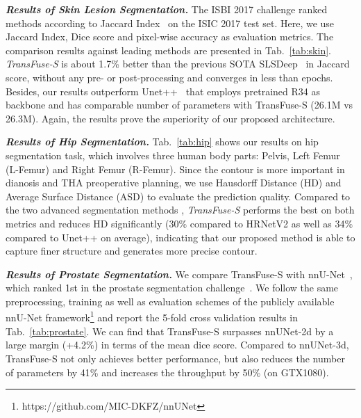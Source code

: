 \documentclass[runningheads]{llncs}
\begin{document}
\textit{\textbf{Results of Skin Lesion Segmentation.}}
The ISBI 2017 challenge ranked methods according to Jaccard Index~\cite{codella2018skin} on the ISIC 2017 test set. Here, we use Jaccard Index, Dice score and pixel-wise accuracy as evaluation metrics. The comparison results against leading methods are presented in Tab.~\ref{tab:skin}. \textit{TransFuse-S} is about 1.7\% better than the previous SOTA SLSDeep~\cite{sarker2018slsdeep} in Jaccard score, without any pre- or post-processing and converges in less than  epochs. Besides, our results outperform Unet++~\cite{zhou2018unet++} that employs pretrained R34 as backbone and has comparable number of parameters with TransFuse-S (26.1M vs 26.3M). Again, the results prove the superiority of our proposed architecture.  


\textit{\textbf{Results of Hip Segmentation.}}
Tab.~\ref{tab:hip} shows our results on hip segmentation task, which involves three human body parts: Pelvis, Left Femur (L-Femur) and Right Femur (R-Femur). Since the contour is more important in dianosis and THA preoperative planning, we use Hausdorff Distance (HD) and Average Surface Distance (ASD) to evaluate the prediction quality. Compared to the two advanced segmentation methods \cite{zhou2018unet++,wang2020deep}, \textit{TransFuse-S} performs the best on both metrics and reduces HD significantly (30\% compared to HRNetV2 as well as 34\% compared to Unet++ on average), indicating that our proposed method is able to capture finer structure and generates more precise contour. 




\textit{\textbf{Results of Prostate Segmentation.}}
We compare TransFuse-S with nnU-Net~\cite{isensee2019automated}, which ranked 1st in the prostate segmentation challenge~\cite{simpson2019large}. We follow the same preprocessing, training as well as evaluation schemes of the publicly available nnU-Net framework\footnote{https://github.com/MIC-DKFZ/nnUNet} and report the 5-fold cross validation results in Tab.~\ref{tab:prostate}. We can find that TransFuse-S surpasses nnUNet-2d by a large margin (+4.2\%) in terms of the mean dice score. Compared to nnUNet-3d, TransFuse-S not only achieves better performance, but also reduces the number of parameters by 41\% and increases the throughput by 50\% (on GTX1080).
\end{document}
